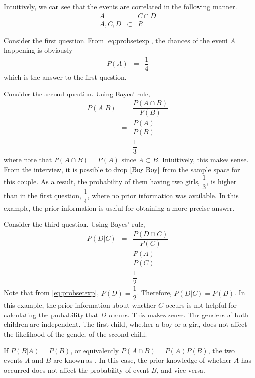 Intuitively, we can see that the events are correlated in the following manner.
\begin{eqnarray}
	A &=& C \cap D \nonumber \\
	A, C, D &\subset& B \nonumber
\end{eqnarray}

Consider the first question. From \eqref{eq:probsetexp}, the chances of the event $A$ happening is obviously
\begin{eqnarray}
P(A) &=& \dfrac{1}{4} \nonumber
\end{eqnarray}
which is the answer to the first question.

Consider the second question. Using Bayes' rule,
\begin{eqnarray}
P(A|B) &=& \dfrac{P\left(A \cap B\right)}{P(B)} \nonumber \\
&=& \dfrac{P(A)}{P(B)} \nonumber \\
&=& \dfrac{1}{3} \nonumber
\end{eqnarray}
where note that $P\left(A \cap B\right) = P(A)$ since $A\subset B$. Intuitively, this makes sense. From the interview, it is possible to drop $\left[\textup{Boy Boy}\right]$ from the sample space for this couple. As a result, the probability of them having two girls, $\dfrac{1}{3}$, is higher than in the first question, $\dfrac{1}{4}$, where no prior information was available. In this example, the prior information is useful for obtaining a more precise answer.

Consider the third question. Using Bayes' rule,
\begin{eqnarray}
P(D|C) &=& \dfrac{P\left(D \cap C\right)}{P(C)} \nonumber \\
&=& \dfrac{P(A)}{P(C)} \nonumber \\
&=& \dfrac{1}{2} \nonumber
\end{eqnarray}
Note that from \eqref{eq:probsetexp}, $P(D) = \dfrac{1}{2}$. Therefore, $P(D|C) = P(D)$. In this example, the prior information about whether $C$ occurs is not helpful for calculating the probability that $D$ occurs. This makes sense. The genders of both children are independent. The first child, whether a boy or a girl, does not affect the likelihood of the gender of the second child.

If $P(B|A)=P(B)$, or equivalently $P(A\cap B) = P(A)P(B)$, the two events $A$ and $B$ are known as . In this case, the prior knowledge of whether $A$ has occurred does not affect the probability of event $B$, and vice versa.

